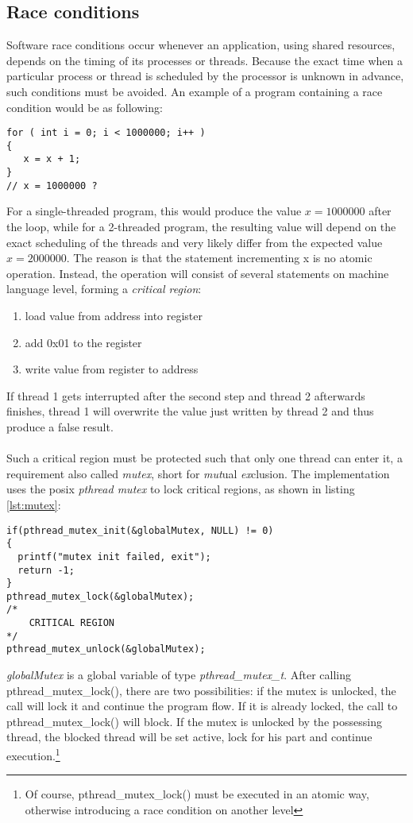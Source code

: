 \subsection{Race conditions}
Software race conditions occur whenever an application, using shared resources, depends on the timing of its processes or threads.
Because the exact time when a particular process or thread is scheduled by the processor is unknown in advance, such conditions must be avoided.
An example of a program containing a race condition would be as following:
\begin{lstlisting}[style=BashInputStyle,caption={Race condition},label=lst:raceCond]
for ( int i = 0; i < 1000000; i++ )
{
   x = x + 1; 
}
// x = 1000000 ?
\end{lstlisting}
For a single-threaded program, this would produce the value $x=1000000$ after the loop, while for a 2-threaded program, the resulting value will depend on the exact scheduling of the
threads and very likely differ from the expected value $x=2000000$. The reason is that the statement incrementing x is no atomic operation. Instead, the operation will consist of
several statements on machine language level, forming a \textit{critical region}:
\begin{enumerate}
 \item load value from address into register
 \item add 0x01 to the register
 \item write value from register to address
\end{enumerate}
If thread 1 gets interrupted after the second step and thread 2 afterwards finishes, thread 1 will overwrite the value just written by thread 2 and thus produce a false result.
\\
\\
Such a critical region must be protected such that only one thread can enter it, a requirement also called \textit{mutex}, short for \textit{mut}ual \textit{ex}clusion.
The implementation uses the \gls{posix} \textit{pthread mutex} to lock critical regions, as shown in listing \ref{lst:mutex}:  
\begin{lstlisting}[style=BashInputStyle,caption={Locking a critical region},label=lst:mutex]
if(pthread_mutex_init(&globalMutex, NULL) != 0)
{
  printf("mutex init failed, exit");
  return -1;
}
pthread_mutex_lock(&globalMutex);
/*
    CRITICAL REGION
*/
pthread_mutex_unlock(&globalMutex);
\end{lstlisting}
\textit{globalMutex} is a global variable of type \textit{pthread\_mutex\_t}. After calling pthread\_mutex\_lock(), there are two possibilities: if the mutex is unlocked, the call will
lock it and continue the program flow. If it is already locked, the call to pthread\_mutex\_lock() will block. If the mutex is unlocked by the possessing thread, the blocked thread will
be set active, lock for his part and continue execution.\footnote{Of course, pthread\_mutex\_lock() must be executed in an atomic way, otherwise introducing a race condition on another
level}

